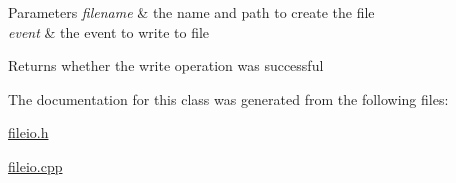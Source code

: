\begin{DoxyParams}{\-Parameters}
{\em filename} & the name and path to create the file \\
\hline
{\em event} & the event to write to file \\
\hline
\end{DoxyParams}
\begin{DoxyReturn}{\-Returns}
whether the write operation was successful 
\end{DoxyReturn}


\-The documentation for this class was generated from the following files\-:\begin{DoxyCompactItemize}
\item 
\hyperlink{fileio_8h}{fileio.\-h}\item 
\hyperlink{fileio_8cpp}{fileio.\-cpp}\end{DoxyCompactItemize}
